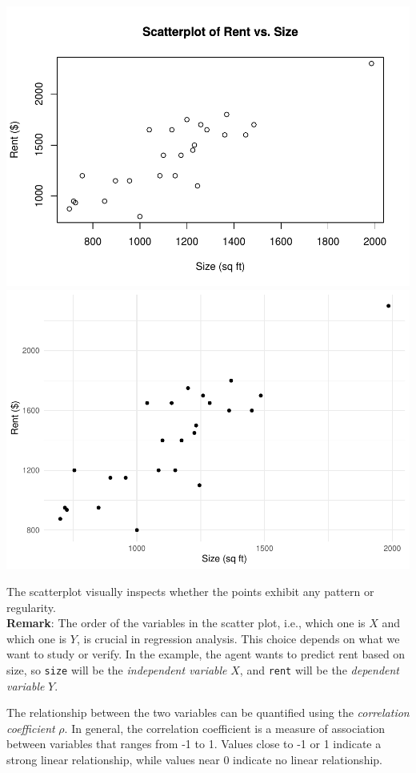 \documentclass[
]{article}
\begin{document}
\includegraphics{Tests_and_Applications_files/figure-latex/unnamed-chunk-34-1.pdf}
\includegraphics{Tests_and_Applications_files/figure-latex/unnamed-chunk-34-2.pdf}

The scatterplot visually inspects whether the points exhibit any pattern
or regularity.\\
\textbf{Remark}: The order of the variables in the scatter plot, i.e.,
which one is \(X\) and which one is \(Y\), is crucial in regression
analysis. This choice depends on what we want to study or verify. In the
example, the agent wants to predict rent based on size, so \texttt{size}
will be the \emph{independent variable} \(X\), and \texttt{rent} will be
the \emph{dependent variable} \(Y\).

The relationship between the two variables can be quantified using the
\emph{correlation coefficient} \(\rho\). In general, the correlation
coefficient is a measure of association between variables that ranges
from -1 to 1. Values close to -1 or 1 indicate a strong linear
relationship, while values near 0 indicate no linear relationship.
\end{document}
